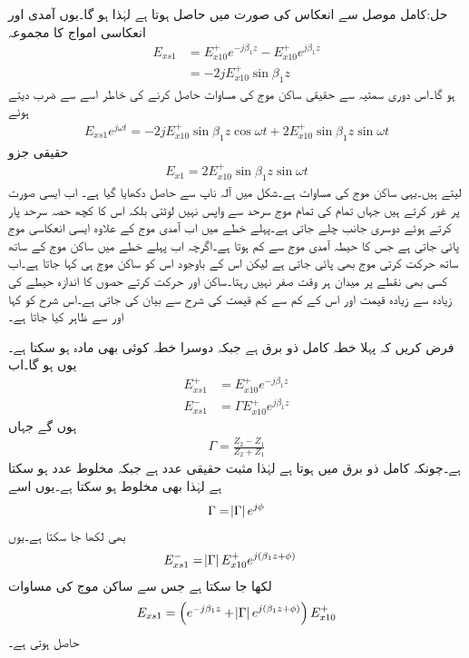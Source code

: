حل:کامل موصل سے انعکاس کی صورت میں  حاصل ہوتا ہے  لہٰذا  ہو گا۔یوں آمدی اور انعکاسی امواج کا مجموعہ
\begin{align*}
E_{xs1}&=E_{x10}^+ e^{-j \beta_1 z} -E_{x10}^+ e^{j \beta_1 z}\\
&=-2 j E_{x10}^+ \sin \beta_1 z
\end{align*}
ہو گا۔اس دوری سمتیہ سے حقیقی ساکن موج کی مساوات حاصل کرنے کی خاطر اسے  سے ضرب دیتے ہوئے
\begin{align*}
E_{xs1} e^{j\omega t}=-2 j E_{x10}^+ \sin \beta_1 z \cos \omega t +2 E_{x10}^+ \sin \beta_1 z \sin \omega t
\end{align*}
 حقیقی جزو
\begin{align*}
E_{x1}=2 E_{x10}^+ \sin \beta_1 z \sin \omega t
\end{align*}
 لیتے ہیں۔یہی ساکن موج کی مساوات ہے۔شکل  میں آلہ ناپ سے حاصل  دکھایا گیا ہے۔
اب ایسی صورت پر غور کرتے ہیں جہاں تمام کی تمام موج سرحد سے واپس نہیں لوٹتی بلکہ اس کا کچھ حصہ سرحد پار کرتے ہوئے دوسری جانب چلے جاتی ہے۔پہلے خطے میں اب آمدی موج کے علاوہ ایسی انعکاسی موج پائی جاتی ہے جس کا حیطہ آمدی موج سے کم ہوتا ہے۔اگرچہ اب پہلے خطے میں ساکن موج کے ساتھ ساتھ حرکت  کرتی موج بھی پائی جاتی ہے لیکن اس کے باوجود اس کو ساکن موج ہی کہا جاتا ہے۔اب کسی بھی نقطے پر میدان ہر وقت صفر نہیں رہتا۔ساکن اور حرکت کرتے حصوں کا اندازہ حیطے کی زیادہ سے زیادہ قیمت اور اس کے کم سے کم قیمت کی شرح سے بیان کی جاتی ہے۔اس شرح کو  کہا اور  سے ظاہر کیا جاتا ہے۔ 

فرض کریں کہ پہلا خطہ کامل ذو برق ہے جبکہ دوسرا خطہ کوئی بھی مادہ ہو سکتا ہے۔یوں  ہو گا۔اب
\begin{align*}
E_{xs1}^+&=E_{x10}^+ e^{-j\beta_1 z}\\
E_{xs1}^-&=\Gamma E_{x10}^+ e^{j\beta_1 z}
\end{align*}
ہوں گے جہاں
\begin{align*}
\Gamma=\frac{Z_2-Z_1}{Z_2+Z_1}
\end{align*}
ہے۔چونکہ کامل ذو برق میں  ہوتا ہے لہٰذا  مثبت حقیقی عدد ہے جبکہ  مخلوط عدد ہو سکتا ہے لہٰذا  بھی مخلوط ہو سکتا ہے۔یوں اسے
\begin{align*}
\Gamma=\abs{\Gamma}e^{j \phi}
\end{align*}
بھی لکھا جا سکتا ہے۔یوں
\begin{align*}
E_{xs1}^-&=\abs{\Gamma} E_{x10}^+ e^{j(\beta_1 z+\phi)}
\end{align*}
لکھا جا سکتا ہے جس سے ساکن موج کی مساوات
\begin{align}\label{مساوات_موج_ساکن_مخلوط_موج}
E_{xs1}=\left(e^{-j\beta_1 z}+\abs{\Gamma} e^{j(\beta_1z +\phi)} \right) E_{x10}^+
\end{align}
حاصل ہوتی ہے۔


